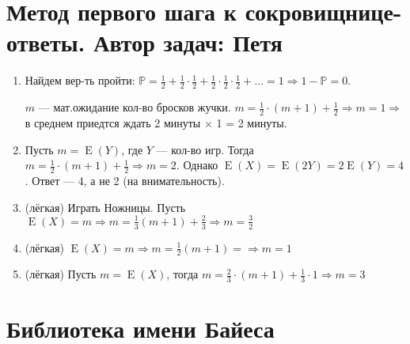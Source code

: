 \documentclass[a4paper,12pt]{article}
\DeclareMathOperator{\E}{E}
\def \P{\mathbb{P}}
\begin{document}
\newpage

\section{Метод первого шага к сокровищнице-ответы. Автор задач: Петя}


\begin{enumerate}
\item Найдем вер-ть пройти: $\P = \frac{1}{2} + \frac{1}{2} \cdot \frac{1}{2} + \frac{1}{2}\cdot\frac{1}{2}\cdot\frac{1}{2} + \dots  = 1 \Rightarrow 1 - \P = 0$.

$m$ — мат.ожидание кол-во бросков жучки. $m=\frac{1}{2}\cdot(m+1) + \frac{1}{2} \Rightarrow m = 1 \Rightarrow $в среднем приедтся ждать 2 минуты $\times$ 1 = 2 минуты.
\item Пусть $m = \E(Y)$, где $Y$ — кол-во игр. Тогда $m = \frac{1}{2} \cdot (m+1) + \frac{1}{2} \Rightarrow m = 2$. Однако $\E(X) = \E(2Y) = 2 \E(Y) = 4$. Ответ — 4, а не 2 (на внимательность).
\item (лёгкая) Играть Ножницы. Пусть $\E(X) = m \Rightarrow m = \frac{1}{3}(m+1) + \frac{2}{3} \Rightarrow m = \frac{3}{2}$
\item (лёгкая) $\E(X) = m \Rightarrow m = \frac{1}{2}(m+1) =\Rightarrow m = 1$
\item (лёгкая) Пусть $m = \E(X)$, тогда $m = \frac{2}{3}\cdot(m+1) + \frac{1}{3} \cdot 1 \Rightarrow m = 3$
\end{enumerate}

\newpage
\section{Библиотека имени Байеса} %
\end{document}
